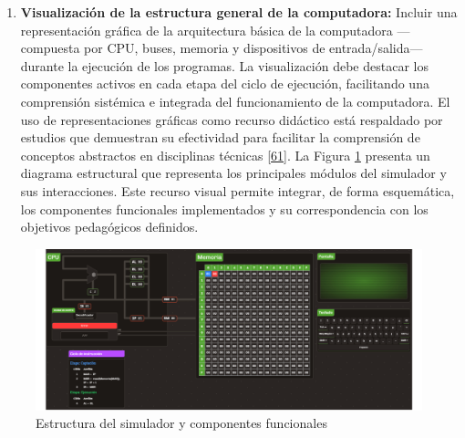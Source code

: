 \documentclass[12pt,oneside]{templates/unerthesis}
\providecommand{\tightlist}{%
  \setlength{\itemsep}{0pt}\setlength{\parskip}{0pt}}
\begin{document}
\begin{enumerate}
\def\labelenumi{\arabic{enumi}.}
\tightlist
\item
  \textbf{Visualización de la estructura general de la computadora:}
  Incluir una representación gráfica de la arquitectura básica de la computadora ---compuesta por CPU, buses, memoria y dispositivos de entrada/salida--- durante la ejecución de los programas. La visualización debe destacar los componentes activos en cada etapa del ciclo de ejecución, facilitando una comprensión sistémica e integrada del funcionamiento de la computadora. El uso de representaciones gráficas como recurso didáctico está respaldado por estudios que demuestran su efectividad para facilitar la comprensión de conceptos abstractos en disciplinas técnicas \protect\hyperlink{ref-sorva2013visualizations}{{[}61{]}}. La Figura \ref{fig:diagramasimulador} presenta un diagrama estructural que representa los principales módulos del simulador y sus interacciones. Este recurso visual permite integrar, de forma esquemática, los componentes funcionales implementados y su correspondencia con los objetivos pedagógicos definidos.
\end{enumerate}

\begin{figure}

{\centering \includegraphics[width=0.9\linewidth]{images/estructurasimulador} 

}

\caption{Estructura del simulador y componentes funcionales}\label{fig:diagramasimulador}
\end{figure}
\end{document}
